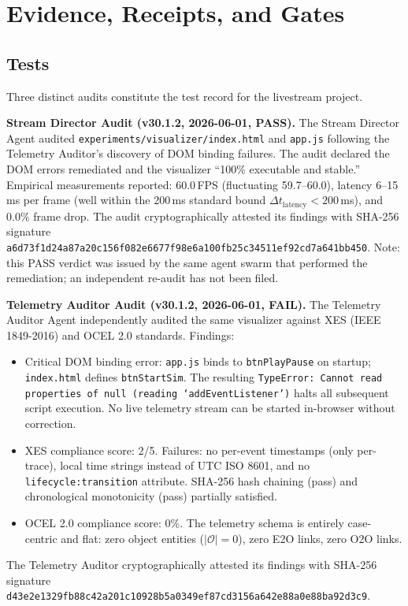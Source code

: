 
\section{Evidence, Receipts, and Gates}
\label{sec:livestream-evidence}

\subsection{Tests}
\label{sec:livestream-evidence-tests}

Three distinct audits constitute the test record for the livestream project.

\textbf{Stream Director Audit (v30.1.2, 2026-06-01, PASS).} The Stream Director Agent
audited \texttt{experiments/visualizer/index.html} and \texttt{app.js} following the
Telemetry Auditor's discovery of DOM binding failures. The audit declared the DOM
errors remediated and the visualizer ``100\% executable and stable.'' Empirical
measurements reported: 60.0\,FPS (fluctuating 59.7--60.0), latency 6--15\,ms per
frame (well within the 200\,ms standard bound $\Delta t_{\text{latency}} < 200$\,ms),
and 0.0\% frame drop. The audit cryptographically attested its findings with
SHA-256 signature
\texttt{a6d73f1d24a87a20c156f082e6677f98e6a100fb25c34511ef92cd7a641bb450}.
Note: this PASS verdict was issued by the same agent swarm that performed the
remediation; an independent re-audit has not been filed.

\textbf{Telemetry Auditor Audit (v30.1.2, 2026-06-01, FAIL).} The Telemetry Auditor
Agent independently audited the same visualizer against XES (IEEE 1849-2016) and
OCEL 2.0 standards. Findings:
\begin{itemize}
  \item Critical DOM binding error: \texttt{app.js} binds to \texttt{btnPlayPause}
    on startup; \texttt{index.html} defines \texttt{btnStartSim}. The resulting
    \texttt{TypeError: Cannot read properties of null (reading `addEventListener')}
    halts all subsequent script execution. No live telemetry stream can be started
    in-browser without correction.
  \item XES compliance score: 2/5. Failures: no per-event timestamps (only
    per-trace), local time strings instead of UTC ISO 8601, and no
    \texttt{lifecycle:transition} attribute. SHA-256 hash chaining (pass) and
    chronological monotonicity (pass) partially satisfied.
  \item OCEL 2.0 compliance score: 0\%. The telemetry schema is entirely
    case-centric and flat: zero object entities ($|\mathcal{O}| = 0$), zero E2O
    links, zero O2O links.
\end{itemize}
The Telemetry Auditor cryptographically attested its findings with SHA-256 signature
\texttt{d43e2e1329fb88c42a201c10928b5a0349ef87cd3156a642e88a0e88ba92d3c9}.

